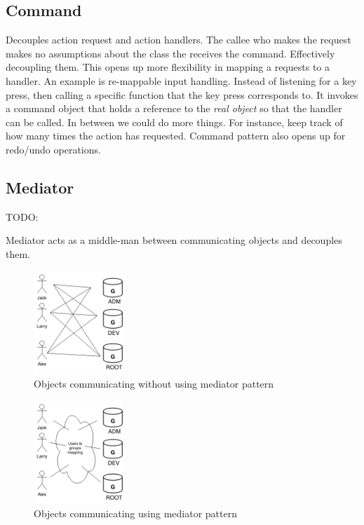 \documentclass[10pt,letterpaper]{article}
\newcommand{\bs}{\bigskip}
\begin{document}
\begin{multicols}{2}
\subsection{Command}

Decouples action request and action handlers. The callee who makes the request makes no assumptions about the class the receives the command. Effectively decoupling them.
\bs
This opens up more flexibility in mapping a requests to a handler. An example is re-mappable input handling. Instead of listening for a key press, then calling a specific function that the key press corresponds to. It invokes a command object that holds a reference to the \textit{real object} so that the handler can be called.
\bs
In between we could do more things. For instance, keep track of how many times the action has requested.
\bs
Command pattern also opens up for redo/undo operations.

\subsection{Mediator}\label{ssection:mediator}

TODO:

Mediator acts as a middle-man between communicating objects and decouples them\cite{sm-mediator}.

\begin{figure}[H]
	\centering
	\includegraphics[width=0.3\textwidth]{assets/mediator_before}
	\caption{Objects communicating without using mediator pattern}
	\label{fig:mediator-before}
\end{figure}

\begin{figure}[H]
	\centering
	\includegraphics[width=0.3\textwidth]{assets/mediator_after}
	\caption{Objects communicating using mediator pattern}
	\label{fig:mediator-after}
\end{figure}


\end{multicols}
\end{document}
